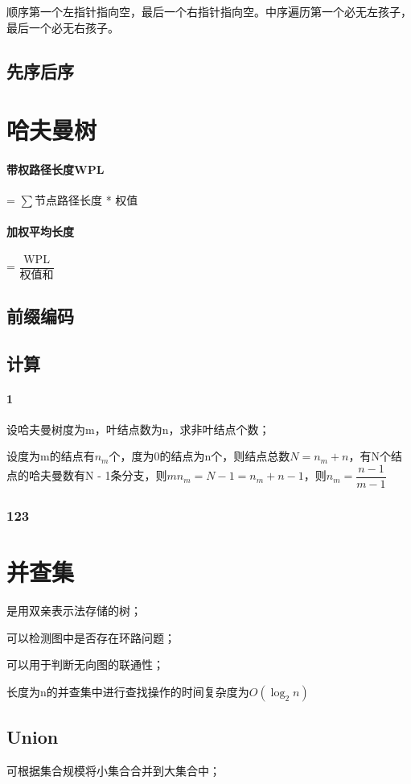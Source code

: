 顺序第一个左指针指向空，最后一个右指针指向空。中序遍历第一个必无左孩子，最后一个必无右孩子。


\subsection{先序后序}


\section{哈夫曼树}

\paragraph{带权路径长度WPL}
 = \(\sum\)节点路径长度 * 权值

\paragraph{加权平均长度}
 = \(\dfrac{\text{WPL}}{\text{权值和}}\)

\subsection{前缀编码}

\subsection{计算}

\paragraph{1}
设哈夫曼树度为m，叶结点数为n，求非叶结点个数；

设度为m的结点有\(n_m\)个，度为0的结点为n个，则结点总数\(N = n_m + n\)，有N个结点的哈夫曼数有N - 1条分支，则\(mn_m = N - 1 = n_m + n - 1\)，则\(n_m = \dfrac{n - 1}{m - 1}\)


\subsubsection{123}


\section{并查集}

是用双亲表示法存储的树；

可以检测图中是否存在环路问题；

可以用于判断无向图的联通性；

长度为n的并查集中进行查找操作的时间复杂度为\(O(\log_2n)\)

\subsection{Union}

可根据集合规模将小集合合并到大集合中；

